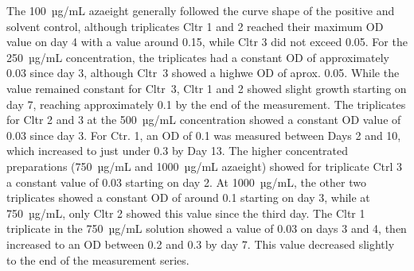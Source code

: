 The 100~µg/mL \acrshort{azaeight} generally followed the curve shape of the positive and solvent control, although triplicates Cltr 1 and 2 reached their maximum \acrshort{OD} value on day 4 with a value around 0.15, while Cltr 3 did not exceed 0.05.
For the 250~µg/mL concentration, the triplicates had a constant \acrshort{OD} of approximately 0.03 since day 3, although Cltr~3 showed a highwe \acrshort{OD} of aprox. 0.05. While the value remained constant for Cltr~3, Cltr 1 and 2 showed slight growth starting on day 7, reaching approximately 0.1 by the end of the measurement. The triplicates for Cltr 2 and 3 at the 500~µg/mL concentration showed a constant \acrshort{OD} value of 0.03 since day 3. For Ctr. 1, an \acrshort{OD} of 0.1 was measured between Days 2 and 10, which increased to just under 0.3 by Day 13.
The higher concentrated preparations (750~µg/mL and 1000~µg/mL \acrshort{azaeight}) showed for triplicate Ctrl 3 a constant value of 0.03 starting on day 2. At 1000~µg/mL, the other two triplicates showed a constant \acrshort{OD} of around 0.1 starting on day 3, while at 750~µg/mL, only Cltr 2 showed this value since the third day.
The Cltr 1 triplicate in the 750~µg/mL solution showed a value of 0.03 on days 3 and 4, then increased to an \acrshort{OD} between 0.2 and 0.3 by day 7. This value decreased slightly to the end of the measurement series.\\

% 



